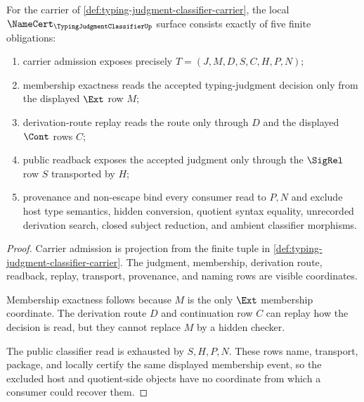 \begin{theorem}
\label{thm:typing-judgment-classifier-namecert-obligations}
For the carrier of \autoref{def:typing-judgment-classifier-carrier}, the local $\NameCert_{\TypingJudgmentClassifierUp}$ surface consists exactly of five finite obligations:
\begin{enumerate}
\item carrier admission exposes precisely $T=(J,M,D,S,C,H,P,N)$;
\item membership exactness reads the accepted typing-judgment decision only from the displayed $\Ext$ row $M$;
\item derivation-route replay reads the route only through $D$ and the displayed $\Cont$ rows $C$;
\item public readback exposes the accepted judgment only through the $\SigRel$ row $S$ transported by $H$;
\item provenance and non-escape bind every consumer read to $P,N$ and exclude host type semantics, hidden conversion, quotient syntax equality, unrecorded derivation search, closed subject reduction, and ambient classifier morphisms.
\end{enumerate}
\end{theorem}
\begin{proof}
Carrier admission is projection from the finite tuple in \autoref{def:typing-judgment-classifier-carrier}. The judgment, membership, derivation route, readback, replay, transport, provenance, and naming rows are visible coordinates.

Membership exactness follows because $M$ is the only $\Ext$ membership coordinate. The derivation route $D$ and continuation row $C$ can replay how the decision is read, but they cannot replace $M$ by a hidden checker.

The public classifier read is exhausted by $S,H,P,N$. These rows name, transport, package, and locally certify the same displayed membership event, so the excluded host and quotient-side objects have no coordinate from which a consumer could recover them.
\end{proof}

